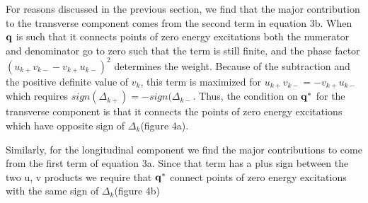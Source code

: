 \documentclass[usletter,aps,prb,10pt,amssymb,amsmath,twocolumn]{revtex4-1}
\begin{document}
For reasons discussed in the previous section, we find that the major contribution to the transverse component comes from the second term in equation 3b. When $\bf q$ is such that it connects points of zero energy excitations both the numerator and denominator go to zero such that the term is still finite, and the phase factor $(u_{k+}v_{k-} -v_{k+}u_{k-})^2$ determines the weight. Because of the subtraction and the positive definite value of $v_k$, this term is maximized for $u_{k+}v_{k-}=-v_{k+}u_{k-}$ which requires $sign(\Delta_{k+})=-sign(\Delta_{k-}$. Thus, the condition on $\bf q^*$ for the transverse component is that it connects the points of zero energy excitations which have opposite sign of $\Delta_{k}$(figure 4a).

Similarly, for the longitudinal component we find the major contributions to come from the first term of equation 3a. Since that term has a plus sign between the two u, v products we require that $\bf q^*$ connect points of zero energy excitations with the same sign of $\Delta_{k}$(figure 4b)
\end{document}
